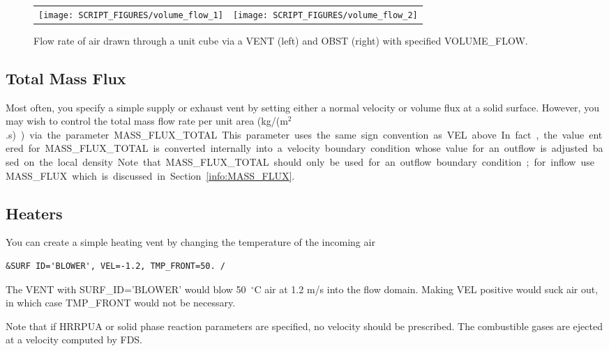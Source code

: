 \documentclass[11pt]{book}
\begin{document}
\begin{figure}[!ht]
\begin{tabular*}{\textwidth}{lr}
\texttt{[image: SCRIPT\_FIGURES/volume\_flow\_1]} &
\texttt{[image: SCRIPT\_FIGURES/volume\_flow\_2]}
\end{tabular*}
\caption[Results of the {\ct volume\_flow} test cases]{Flow rate of air drawn through a unit cube via a {\ct VENT} (left) and {\ct OBST} (right) with specified {\ct VOLUME\_FLOW}.}
\label{volume_flow}
\end{figure}



\subsection{Total Mass Flux}

\label{info:MASS_FLUX_TOTAL}

Most often, you specify a simple supply or exhaust vent by setting either a normal velocity or volume flux at a solid surface. However, you may wish to control the total mass flow rate per unit area (\si{kg/(m$^2$.s)}) via the parameter {\ct MASS\_FLUX\_TOTAL}. This parameter uses the same sign convention as {\ct VEL} above.  In fact, the value entered for {\ct MASS\_FLUX\_TOTAL} is converted internally into a velocity boundary condition whose value for an outflow is adjusted based on the local density. Note that {\ct MASS\_FLUX\_TOTAL} should only be used for an outflow boundary condition; for inflow use {\ct MASS\_FLUX} which is discussed in Section~\ref{info:MASS_FLUX}.


\subsection{Heaters}

You can create a simple heating vent by changing the temperature of the incoming air
\begin{lstlisting}
&SURF ID='BLOWER', VEL=-1.2, TMP_FRONT=50. /
\end{lstlisting}
The {\ct VENT} with {\ct SURF\_ID='BLOWER'} would blow 50~$^\circ$C air at 1.2 m/s into the flow domain. Making {\ct VEL} positive would suck air out, in which case {\ct TMP\_FRONT} would not be necessary.

Note that if {\ct HRRPUA} or solid phase reaction parameters are specified, no velocity should be prescribed. The combustible gases are ejected at a velocity computed by FDS.
\end{document}
